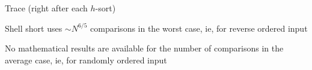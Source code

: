 \documentclass[8pt,a4paper,compress]{beamer}
\begin{document}
\begin{frame}[fragile]
\pause

Trace (right after each $h$-sort)
\begin{center}
\end{center}
\end{frame}

\begin{frame}[fragile]
\pause

Shell short uses $\sim N^{6/5}$ comparisons in the worst case, ie, for reverse ordered input

\pause
\bigskip

No mathematical results are available for the number of comparisons in the average case, ie, for randomly ordered input
\end{frame}
\end{document}
